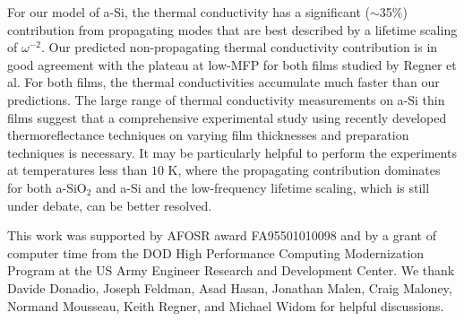 \documentclass[aps,prb,onecolumn,preprint,superscriptaddress,footinbib,amsmath,amssymb,floatfix]{revtex4}
\begin{document}
For our model of a-Si, 
the thermal conductivity has a significant ($\sim$35$\%$) 
contribution from propagating modes that are best 
described by a lifetime scaling of $\omega^{-2}$. Our predicted 
non-propagating thermal conductivity contribution is in good 
agreement with the plateau at low-MFP for both films studied by 
Regner et al. For both films, the thermal conductivities accumulate 
much faster than our predictions. 
The large range of thermal conductivity measurements on 
a-Si thin films suggest that a comprehensive 
experimental study using recently developed thermoreflectance 
techniques\cite{koh_frequency_2007,minnich_thermal_2011,
regner_broadband_2013,regner_instrumentation_2013} 
on varying film thicknesses and preparation techniques is necessary.  
It may be particularly helpful to perform the experiments 
at temperatures less than $10$ K, where the propagating contribution 
dominates for both a-SiO$_2$ and a-Si and the low-frequency 
lifetime scaling, which is still under debate, can be better resolved. 
\cite{graebner_phonon_1986,freeman_thermal_1986,cahill_lattice_1988,
love_estimate_1990,feldman_thermal_1993,
cahill_thermal_1994,feldman_numerical_1999,
zink_excess_2006,zink_thermal_2006,baldi_thermal_2008,
liu_high_2009,yang_anomalously_2010,baldi_sound_2010,
baldi_elastic_2011,baldi_emergence_2013} 

\begin{acknowledgments}
This work was supported by AFOSR award FA95501010098 and by a grant 
of computer time from the DOD 
High Performance Computing Modernization Program at the US Army 
Engineer 
Research and Development Center. 
We thank Davide Donadio, Joseph Feldman, Asad Hasan, Jonathan Malen,  
Craig Maloney, Normand Mousseau, Keith Regner, and Michael Widom 
for helpful discussions.
\end{acknowledgments}



\end{document}
